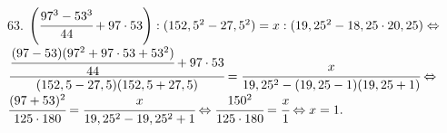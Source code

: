 63. $\left(\cfrac{97^3-53^3}{44}+97\cdot 53\right): (152,5^2-27,5^2)=x:(19,25^2-18,25\cdot20,25)\Leftrightarrow$\\$
\cfrac{\cfrac{(97-53)(97^2+97\cdot53+53^2)}{44}+97\cdot 53}{(152,5-27,5)(152,5+27,5)}=\cfrac{x}{19,25^2-(19,25-1)(19,25+1)}\Leftrightarrow$\\
$\cfrac{(97+53)^2}{125\cdot180}=\cfrac{x}{19,25^2-19,25^2+1}\Leftrightarrow\cfrac{150^2}{125\cdot180}=\cfrac{x}{1}\Leftrightarrow x=1.$\\
